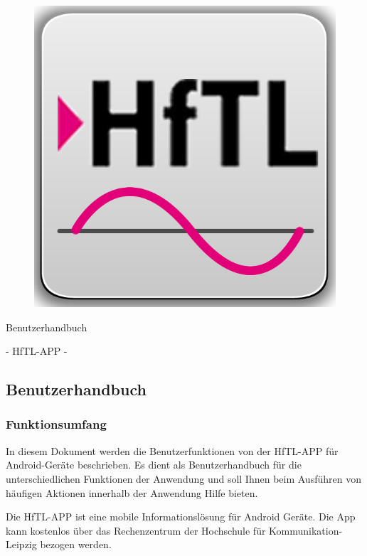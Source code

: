 \begin{figure}[h]
	\centering
	\includegraphics[scale=2.5]{03_Bedienungsanleitung/img/Logo_HFTl_App.png}
	\label{img:grafik-dummy}
\end{figure}

\begin{center}
	{\huge Benutzerhandbuch}
\end{center}

\begin{center}
	{\huge -  HfTL-APP  -}
\end{center}



\newpage
\subsection{Benutzerhandbuch}
\subsubsection{Funktionsumfang}
In diesem Dokument werden die Benutzerfunktionen von der HfTL-APP für
Android-Geräte beschrieben. Es dient als Benutzerhandbuch für die
unterschiedlichen Funktionen der Anwendung und soll Ihnen beim
Ausführen von häufigen Aktionen innerhalb der Anwendung Hilfe bieten.

Die HfTL-APP ist eine mobile Informationslösung für Android Geräte. Die App kann kostenlos über das Rechenzentrum der Hochschule für Kommunikation-Leipzig bezogen werden.

